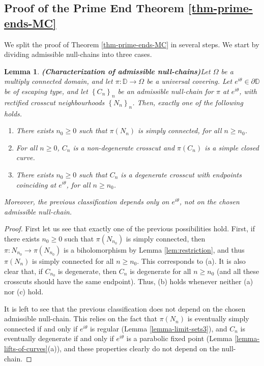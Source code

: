 \documentclass[11pt,a4paper,reqno]{amsart}
\theoremstyle{plain}
\newtheorem{lemma}[thm]{Lemma}
\theoremstyle{definition}
\theoremstyle{plain}
\begin{document}
\subsection*{Proof of the Prime End Theorem \ref{thm-prime-ends-MC}}
We split the proof of Theorem \ref{thm-prime-ends-MC} in several steps. We start by dividing admissible null-chains into three cases.
\begin{lemma}{\bf (Characterization of admissible null-chains)}\label{lemma-technical-null-chains} Let $ \Omega $ be a multiply connected domain, and let $\pi\colon\mathbb{D}\to\Omega $ be a universal covering. Let $ e^{i\theta} \in\partial \mathbb{D}$ be of escaping type, and let  $ \left\lbrace C_n\right\rbrace _n $ be an admissible null-chain for $ \pi $ at $ e^{i\theta} $, with rectified crosscut neighbourhoods $ \left\lbrace N_n\right\rbrace _n $. Then, exactly one of the following holds.
	\begin{enumerate}[label={\normalfont (\alph*)}]
		\item There exists $ n_0\geq 0 $ such that $ \pi (N_n) $ is simply connected, for all $ n\geq n_0 $.
		\item  For all $ n\geq 0 $, $ C_n $ is a non-degenerate crosscut and $ \pi (C_n) $ is a simple closed curve.
		\item There exists $ n_0\geq 0 $ such that $ C_n $ is a degenerate crosscut with endpoints coinciding at $ e^{i\theta} $, for all $ n\geq n_0 $.
	\end{enumerate}
Moreover, the previous classification depends only on $ e^{i\theta} $, not on the chosen admissible null-chain.
\end{lemma}
\begin{proof}
First let us see that exactly one of the previous possibilities hold. First, if there exists $ n_0\geq 0 $ such that $ \pi (N_{n_0}) $ is simply connected, then $\pi\colon N_{n_0}\to\pi(N_{n_0})$ is a biholomorphism by Lemma \ref{lem:restriction}, and thus $ \pi (N_{n}) $ is simply connected for all $ n\geq n_0 $. This corresponds to (a). It is also clear that, if $ C_{n_0} $ is degenerate, then $ C_n $ is degenerate for all $ n\geq n_0 $ (and all these crosscuts should have the same endpoint). Thus, (b) holds whenever neither (a) nor (c) hold.

It is left to see that the previous classification does not depend on the chosen admissible null-chain. This relies on the fact that $ \pi (N_{n}) $ is eventually simply connected if and only if $ e^{i\theta} $ is regular (Lemma \ref{lemma-limit-sets3}), and $ C_{n} $ is eventually degenerate if and only if  $ e^{i\theta} $ is a parabolic fixed point (Lemma \ref{lemma-lifts-of-curves}(a)), and these properties clearly do not depend on the null-chain.
\end{proof}
\end{document}
